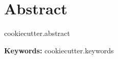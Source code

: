 \chapter*{Abstract}

 {{cookiecutter.abstract}}

\vspace{4cm}
\textbf{Keywords:} {{cookiecutter.keywords}}

